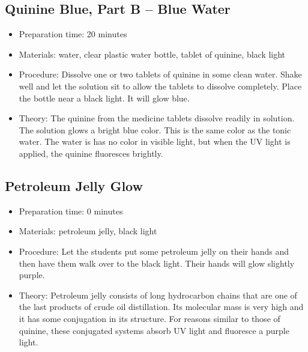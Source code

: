 \subsection{Quinine Blue, Part B -- Blue Water}
\begin{itemize}
\item{Preparation time: 20 minutes}
\item{Materials: water, clear plastic water bottle, tablet of quinine, black light}
\item{Procedure: Dissolve one or two tablets of quinine in some clean water. Shake well and let the solution sit to allow the tablets to dissolve completely. Place the bottle near a black light. It will glow blue.}
\item{Theory: The quinine from the medicine tablets dissolve readily in solution. The solution glows a bright blue color. This is the same color as the tonic water. The water is has no color in visible light, but when the UV light is applied, the quinine fluoresces brightly.}
\end{itemize}

\subsection{Petroleum Jelly Glow}
\begin{itemize}
\item{Preparation time: 0 minutes}
\item{Materials: petroleum jelly, black light}
\item{Procedure: Let the students put some petroleum jelly on their hands and then have them walk over to the black light. Their hands will glow slightly purple.}
\item{Theory: Petroleum jelly consists of long hydrocarbon chains that are one of the last products of crude oil distillation. Its molecular mass is very high and it has some conjugation in its structure. For reasons similar to those of quinine, these conjugated systems absorb UV light and fluoresce a purple light. }
\end{itemize}


